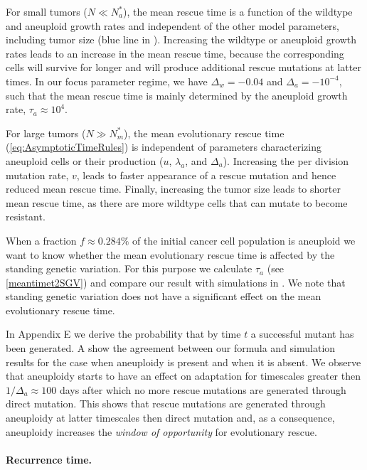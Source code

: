 \documentclass[12pt]{extarticle}
\begin{document}
For small tumors ($ N \ll N_a^*$), the mean rescue time is a function of the wildtype and aneuploid growth rates and independent of the other model parameters, including tumor size (blue line in ).
Increasing the wildtype or aneuploid growth rates leads to an increase in the mean rescue time, because the corresponding cells will survive for longer and will produce additional rescue mutations at latter times.
In our focus parameter regime, we have $\Delta_w=-0.04$ and $\Delta_a=-10^{-4}$, such that the mean rescue time is mainly determined by the aneuploid growth rate, $\tau_a \approx 10^4$.

For large tumors ($N \gg N_m^*$), the mean evolutionary rescue time (\cref{eq:AsymptoticTimeRules}) is independent of parameters characterizing aneuploid cells or their production ($u$, $\lambda_a$, and $\Delta_a$). %
 Increasing the per division mutation rate, $v$, leads to faster appearance of a rescue mutation and hence reduced mean rescue time. 
Finally, increasing the tumor size leads to shorter mean rescue time, as there are more wildtype cells that can mutate to become resistant. 

When a fraction $f\approx 0.284\%$ of the initial cancer cell population is aneuploid we want to know whether the mean evolutionary rescue time is affected by the standing genetic variation. For this purpose we calculate  $\tau_a$ (see \cref{meantimet2SGV}) and compare our result with simulations in  . We note that standing genetic variation does not have a significant effect on the mean evolutionary rescue time. %

In Appendix E we derive the probability that by time $t$ a successful mutant has been generated. A show the agreement between our formula and simulation results for the case when aneuploidy is present and when it is absent. We observe that aneuploidy starts to have an effect on adaptation for timescales greater then $1/\Delta_a\approx100$ days after which no more rescue mutations are generated through direct mutation. This shows that rescue mutations are generated through aneuploidy at latter timescales then direct mutation and, as a consequence, aneuploidy increases the \emph{window of opportunity} for evolutionary rescue.   %


\paragraph{Recurrence time.}
\end{document}
